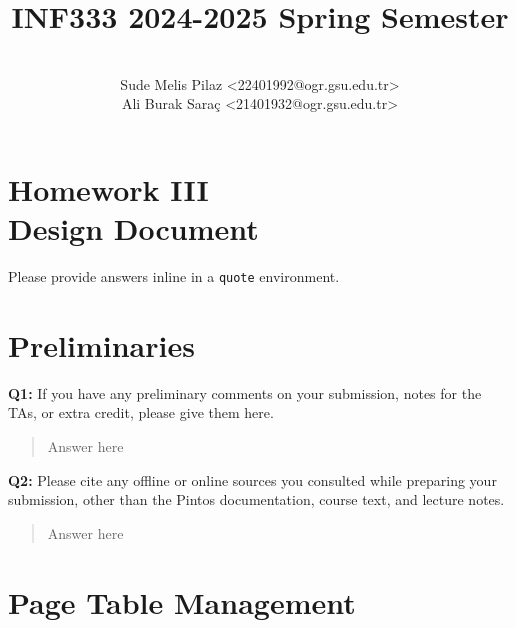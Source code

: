 \documentclass[a4paper,11pt]{paper}
\title{INF333 2024-2025 Spring Semester}
\author{
\textbf{\color{teal}{Pintocchio}} 
\\ Sude Melis Pilaz <22401992@ogr.gsu.edu.tr>
\\ Ali Burak Saraç <21401932@ogr.gsu.edu.tr>}
\begin{document}
\maketitle

\section*{\LARGE Homework III \\
Design Document}

Please provide answers inline in a \texttt{quote} environment.


\section{Preliminaries}

\textbf{Q1:} If you have any preliminary comments on your submission, notes for the TAs, or extra credit, please give them here.
\begin{quote}
  Answer here
\end{quote}


\textbf{Q2:} Please cite any offline or online sources you consulted while preparing your
submission, other than the Pintos documentation, course text, and lecture notes.
\begin{quote}
  Answer here
\end{quote}


\newpage
\section{Page Table Management}
\end{document}
